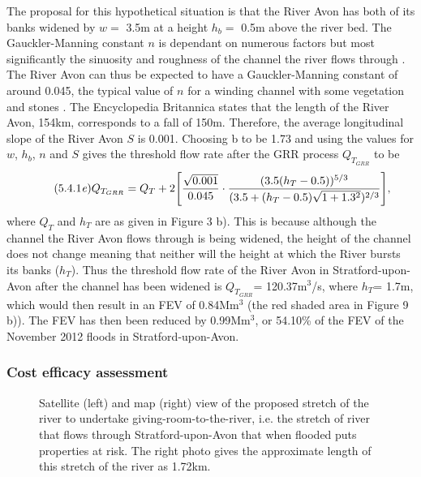 \documentclass[11pt,a4paper]{article}
\begin{document}
The proposal for this hypothetical situation is that the River Avon has both of its banks widened by $w=$ 3.5m at a height $h_b=$ 0.5m above the river bed. The Gauckler-Manning constant $n$ is dependant on numerous factors but most significantly the sinuosity and roughness of the channel the river flows through \cite{manning}. The River Avon can thus be expected to have a Gauckler-Manning constant of around 0.045, the typical value of $n$ for a winding channel with some vegetation and stones \cite{n}. The Encyclopedia Britannica \cite{britannica} states that the length of the River Avon, 154km, corresponds to a fall of 150m. Therefore, the average longitudinal slope of the River Avon $S$ is 0.001. Choosing b to be 1.73 and using the values for $w$, $h_b$, $n$ and $S$ gives the threshold flow rate after the GRR process $Q_{T_{GRR}}$ to be
\begin{equation}\tag{5.4.1\textit{e}}
Q_{T_{GRR}}=Q_T+2\Bigg[\frac{\sqrt{0.001}}{0.045}\cdot\frac{(3.5(h_T-0.5))^{5/3}}{(3.5+(h_T-0.5)\sqrt{1+1.3^2})^{2/3}}\Bigg],
\end{equation}
where $Q_T$ and $h_T$ are as given in Figure 3 b). This is because although the channel the River Avon flows through is being widened, the height of the channel does not change meaning that neither will the height at which the River bursts its banks ($h_T$). Thus the threshold flow rate of the River Avon in Stratford-upon-Avon after the channel has been widened is $Q_{T_{GRR}}$= 120.37m$^3$/s, where $h_T$= 1.7m, which would then result in an FEV of 0.84Mm$^3$ (the red shaded area in Figure 9 b)). The FEV has then been reduced by 0.99Mm$^3$, or 54.10\% of the FEV of the November 2012 floods in Stratford-upon-Avon.

\subsubsection{Cost efficacy assessment}
\begin{figure}[ht!]
\caption{Satellite (left) and map (right) view \cite{maps} of the proposed stretch of the river to undertake giving-room-to-the-river, i.e. the stretch of river that flows through Stratford-upon-Avon that when flooded puts properties at risk. The right photo gives the approximate length of this stretch of the river as 1.72km.}
\end{figure}
\end{document}
